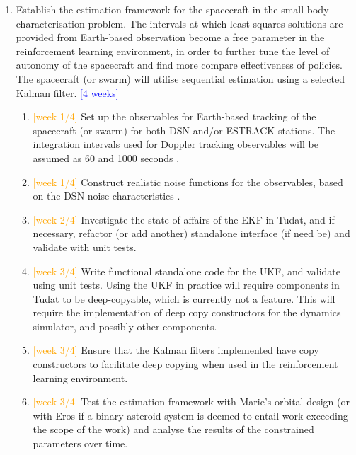 \begin{enumerate}
    \item Establish the estimation framework for the spacecraft in the small body characterisation problem. The intervals at which least-squares solutions are provided from Earth-based observation become a free parameter in the reinforcement learning environment, in order to further tune the level of autonomy of the spacecraft and find more compare effectiveness of policies. The spacecraft (or swarm) will utilise sequential estimation using a selected Kalman filter. \textcolor{blue}{[4 weeks]}
    \begin{enumerate}
        \item \textcolor{orange}{[week 1/4]} Set up the observables for Earth-based tracking of the spacecraft (or swarm) for both \gls{DSN} and/or \gls{ESTRACK} stations. The integration intervals used for Doppler tracking observables will be assumed as 60 and 1000 seconds \cite{Dirkx2019}. 
        \item \textcolor{orange}{[week 1/4]} Construct realistic noise functions for the observables, based on the \gls{DSN} noise characteristics \cite[p.~33]{Thorton2003}.
        \item \textcolor{orange}{[week 2/4]} Investigate the state of affairs of the \gls{EKF} in Tudat, and if necessary, refactor (or add another) standalone interface (if need be) and validate with unit tests.
        \item \textcolor{orange}{[week 3/4]} Write functional standalone code for the \gls{UKF}, and validate using unit tests. Using the \gls{UKF} in practice will require components in Tudat to be deep-copyable, which is currently not a feature. This will require the implementation of deep copy constructors for the dynamics simulator, and possibly other components.
        \item \textcolor{orange}{[week 3/4]} Ensure that the Kalman filters implemented have copy constructors to facilitate deep copying when used in the reinforcement learning environment.
        \item \textcolor{orange}{[week 3/4]} Test the estimation framework with Marie's orbital design (or with Eros if a binary asteroid system is deemed to entail work exceeding the scope of the work) and analyse the results of the constrained parameters over time.
    \end{enumerate}


\end{enumerate}
